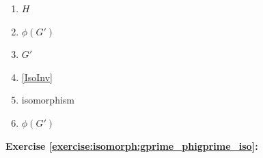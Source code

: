 %

\begin{multicols}{3}
\begin{enumerate}
\item
$H$

\item
$\phi(G')$

\item
$G'$

\item
\ref{IsoInv}

\item
isomorphism

\item
$\phi(G')$
\end{enumerate}
\end{multicols}

\noindent\textbf{Exercise \ref{exercise:isomorph:gprime_phigprime_iso}:}
%
%
%

